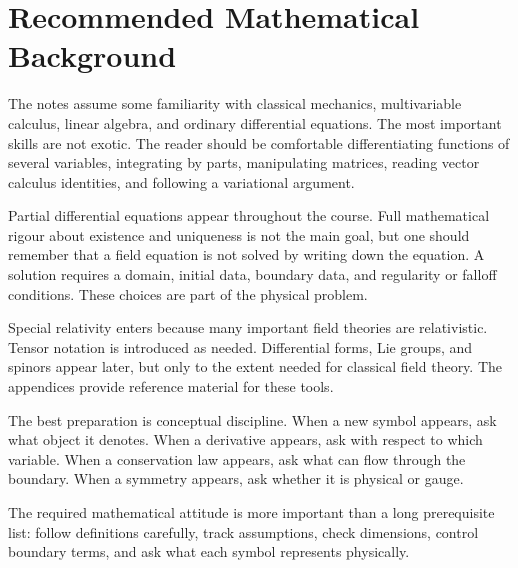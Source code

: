 \section{Recommended Mathematical Background}

The notes assume some familiarity with classical mechanics, multivariable
calculus, linear algebra, and ordinary differential equations. The most important
skills are not exotic. The reader should be comfortable differentiating functions
of several variables, integrating by parts, manipulating matrices, reading vector
calculus identities, and following a variational argument.

Partial differential equations appear throughout the course. Full mathematical
rigour about existence and uniqueness is not the main goal, but one should
remember that a field equation is not solved by writing down the equation. A
solution requires a domain, initial data, boundary data, and regularity or falloff
conditions. These choices are part of the physical problem.

Special relativity enters because many important field theories are
relativistic. Tensor notation is introduced as needed. Differential forms, Lie
groups, and spinors appear later, but only to the extent needed for classical
field theory. The appendices provide reference material for these tools.

The best preparation is conceptual discipline. When a new symbol appears, ask
what object it denotes. When a derivative appears, ask with respect to which
variable. When a conservation law appears, ask what can flow through the
boundary. When a symmetry appears, ask whether it is physical or gauge.

\begin{summarybox}
The required mathematical attitude is more important than a long prerequisite
list: follow definitions carefully, track assumptions, check dimensions, control
boundary terms, and ask what each symbol represents physically.
\end{summarybox}
